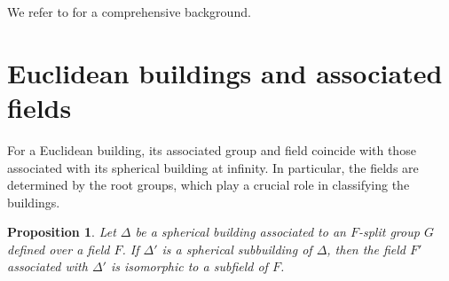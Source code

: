 \documentclass[letterpaper, reqno, 11pt]{amsart}
\newtheorem{prop}[theorem]{Proposition}
\theoremstyle{definition}
\theoremstyle{definition}
\theoremstyle{remark}
\begin{document}
We refer to \cite{morris2015introduction} for a comprehensive background.




\section{Euclidean buildings and associated fields}

For a Euclidean building, its associated group and field coincide with those associated with its spherical building at infinity.  
In particular, the fields are determined by the root groups, which play a crucial role in classifying the buildings. 
 
  


\begin{prop} \label{field} 
    Let $\Delta$ be a spherical building associated to an $F$-split group $G$ defined over a field $F$.
    If $\Delta'$ is a spherical subbuilding of $\Delta$,
    then the field $F'$ associated with $\Delta'$ is isomorphic to a subfield of $F$.
\end{prop}
\end{document}

